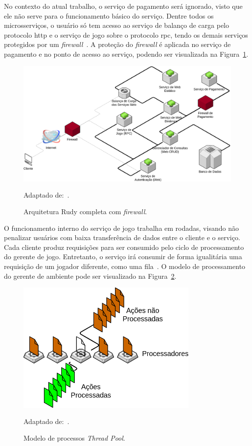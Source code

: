 No contexto do atual trabalho, o serviço de pagamento será ignorado, visto que ele não serve para o funcionamento básico do serviço.
%
Dentre todos os microsserviços, o usuário só tem acesso ao serviço de balanço de carga pelo protocolo \ac{http} e o serviço de jogo sobre o protocolo \ac{rpc}, tendo os demais serviços protegidos por um \textit{firewall}~\cite{matthiasrudy2011}.
%
A proteção do \textit{firewall} é aplicada no serviço de pagamento e no ponto de acesso ao serviço, podendo ser visualizada na Figura~\ref{full_rudy_fw}.


\begin{figure}[htb!]
  \caption{Arquitetura Rudy completa com \textit{firewall}.}
  \label{full_rudy_fw}
  \includegraphics[width=\textwidth]{arquiteturas/full_rudy_fw.png}
  \centering

  Adaptado de:~\cite{matthiasrudy2011}.
\end{figure}




O funcionamento interno do serviço de jogo trabalha em rodadas, visando não penalizar usuários com baixa transferência de dados entre o cliente e o serviço.
%
Cada cliente produz requisições para ser consumido pelo ciclo de processamento do gerente de jogo.
%
Entretanto, o serviço irá consumir de forma igualitária uma requisição de um jogador diferente, como uma fila~\cite{albion_online_unite, matthiasrudy2011}.
%
O modelo de processamento do gerente de ambiente pode ser visualizado na Figura~\ref{fig:thread_pool}.


\begin{figure}[htb!]
  \caption{Modelo de processos \textit{Thread Pool}.}
  \label{fig:thread_pool}
  \includegraphics[height=6.5cm]{arquiteturas/thread_pool.png}
  \centering

  Adaptado de:~\cite{matthiasrudy2011, Ringler2014Dec}.
\end{figure}

